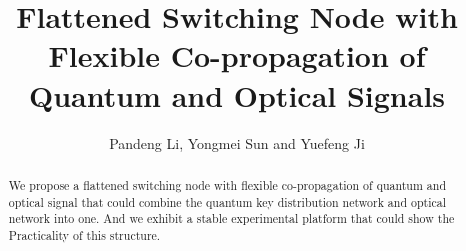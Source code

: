 \documentclass[letterpaper,10pt]{article}
\begin{document}
\title{Flattened Switching Node with Flexible Co-propagation of Quantum and Optical Signals}
\author{Pandeng Li, Yongmei Sun and Yuefeng Ji}
\address{State Key Laboratory of Information Photonics and Optical Communications, School of Information and Telecommunication Engineering, BUPT Beijing, China, 100876}
\begin{abstract}
\noindent We propose a flattened switching node with flexible co-propagation of quantum and optical signal that could combine the quantum key distribution network and optical network into one. And we exhibit a stable experimental platform that could show the Practicality of this structure.
\end{abstract}
\end{document}
